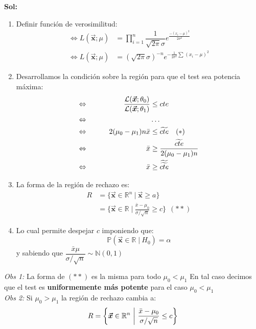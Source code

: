 \documentclass[letterpaper,10.5pt,twocolumn]{article} %
\newcommand{\R}[1][]{\mathbb{R}^{#1}}
\newcommand{\N}{\mathbb{N} }
\newcommand{\Proba}{\mathbb{P} }
\newcommand{\vect}[1]{\boldsymbol{\vec{#1}}}
\newcommand{\normal}[2]{\N({#1},{#2})}
\let\oldfrac=\frac
\renewcommand{\frac}[2]{\ensuremath{\oldfrac{#1}{#2}}}
\begin{document}
\textbf{Sol:}
\begin{enumerate}
	\item Definir función de verosimilitud:
	\begin{align*}
		\Leftrightarrow L(\vect{x}; \mu) &= \prod_{i=1}^{n} \dfrac{1}{\sqrt{2\pi} \sigma} e^{\frac{-(x_i - \mu)^2}{2\sigma^2}}\\
		\Leftrightarrow L(\vect{x}; \mu) &= (\sqrt{2\pi} \sigma)^{-n} e^{-\frac{1}{2\sigma^2} \sum_{}^{} (x_i - \mu )^2 }
	\end{align*}
	\item Desarrollamos la condición sobre la región para que el test sea potencia máxima:
    \def\LRA{\Leftrightarrow\mkern40mu} %
	\begin{alignat*}{2}
	    \LRA && \dfrac{\mathcal{L}(\vect{x};\theta_0) }{\mathcal{L}(\vect{x};\theta_1)} &\leq cte\\
		\LRA && &\ldots \\
		\LRA && 2(\mu_0 - \mu_1) n\bar{x} &\leq \widetilde{cte}\ \ \ (*)\\
		\LRA && \bar{x} &\geq \dfrac{\widetilde{cte}}{2(\mu_0 - \mu_1)n}\\
        \LRA && \bar{x} &\geq \widetilde{\widetilde{cte}}
	\end{alignat*}
	\item La forma de la región de rechazo es:
	\begin{align*}
		R &= \{\vect{x} \in \R[n]\ |\ \vect{x} \geq a \}\\
		&= \{\vect{x} \in \R\ |\ \frac{\bar{x} - \mu_0}{\sigma/\sqrt{n}} \geq c \} \ \ (**)
	\end{align*}
	\item Lo cual permite despejar $c$ imponiendo que:
	\begin{equation*}
		\Proba(\vect{x} \in \R\ |\ H_0) = \alpha
	\end{equation*}
	y sabiendo que $\dfrac{\bar{x} \mu}{\sigma/\sqrt{n}} \sim \normal{0}{1} $
\end{enumerate}

\textit{Obs 1:} La forma de $(**)$ es la misma para todo $\mu_0<\mu_1 $ En tal caso decimos que el test es \textbf{uniformemente más potente} para el caso $\mu_0 < \mu_1 $\\

\textit{Obs 2:} Si $\mu_0>\mu_1 $ la región de rechazo cambia a:
\begin{equation*}
	R = \left\{ \vect{x} \in \R[n]\ \bigg{|}\ \frac{\bar{x} - \mu_0}{\sigma/\sqrt{n}} \leq c \right\}
\end{equation*}
\end{document}
